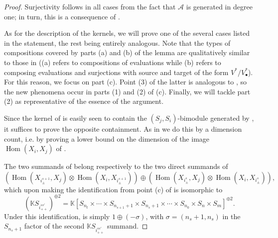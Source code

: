 \documentclass[11pt]{article}
\theoremstyle{plain}
\theoremstyle{nonumberplain}
\theoremstyle{plain}
\theoremstyle{nonumberplain}
\newtheorem{proof}{Proof}
\newcommand\bK{\mathbb K}
\newcommand\cA{\mathcal A}
\DeclareMathOperator{\Hom}{\mathrm{Hom}}
\begin{document}
\begin{proof}
  Surjectivity follows in all cases from the fact that $\cA$ is
  generated in degree one; in turn, this is a consequence of
  .

  As for the description of the kernels, we will prove one of the
  several cases listed in the statement, the rest being entirely
  analogous.
  Note that the types of compositions covered by parts (a) and (b) of
  the lemma are qualitatively similar to those in \cite[Lemma 3.26,
  (a) and (b)]{us2} ((a) refers to compositions of evaluations while
  (b) refers to composing evaluations and surjections with source and
  target of the form $V^*/V^*_{\bullet}$). For this reason, we focus
  on part (c). Point (3) of the latter is analogous to \cite[Lemma
  3.26 (c)]{us2}, so the new phenomena occur in parts (1) and (2) of
  (c). Finally, we will tackle part (2) as representative of the
  essence of the argument.

  Since the kernel of  is easily seen to contain the
  $(S_j,S_i)$-bimodule generated by , it suffices to
  prove the opposite containment. As in \cite[Lemma 3.26]{us2} we do
  this by a dimension count, i.e. by proving a lower
  bound on the dimension of the image $\Hom(X_i,X_j)$ of
  .
  
  The two summands of  belong respectively to the two direct
  summands of
  \begin{equation*}
    \left(\Hom(X_{i^{s+1}_{\pm}},X_j)\otimes
      \Hom(X_i,X_{i^{s+1}_{\pm}})\right)\oplus \left(\Hom(X_{i^s_{\pm}},X_j)\otimes\Hom(X_i,X_{i^s_{\pm}})\right), 
  \end{equation*}
  which upon making the identification from point (c) of
   is isomorphic to
  \begin{equation*}
    \left(\bK S_{i^{ss'}_{++}}\right)^{\oplus 2} = \bK [S_{n_t}\times\cdots \times S_{n_{s+1}+1}\times S_{n_s+1}\times\cdots\times S_{n_0}\times S_n\times S_m]^{\oplus 2}. 
  \end{equation*}
  Under this identification,  is simply
  $1\oplus (-\sigma)$, with $\sigma=(n_s+1,n_s)$ in the $S_{n_s+1}$
  factor of the second $\bK S_{i^{ss'}_{++}}$ summand.


\end{proof}
\end{document}
